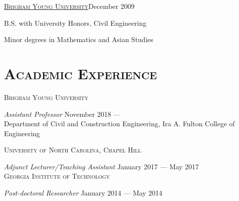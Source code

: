 \documentclass[margin,line]{res}
\newenvironment{list1}{
  \begin{list}{\ding{113}}{%
      \setlength{\itemsep}{0in}
      \setlength{\parsep}{0in} \setlength{\parskip}{0in}
      \setlength{\topsep}{0in} \setlength{\partopsep}{0in}
      \setlength{\leftmargin}{0.17in}}}{\end{list}}
\newenvironment{list2}{
  \begin{list}{$\bullet$}{%
      \setlength{\itemsep}{0in}
      \setlength{\parsep}{0in} \setlength{\parskip}{0in}
      \setlength{\topsep}{0in} \setlength{\partopsep}{0in}
      \setlength{\leftmargin}{0.2in}}}{\end{list}}
\newcommand{\secfont}{\scshape }
\newcommand{\acc}{\scshape }
\begin{document}
\begin{resume}
\href{http://www.byu.edu}{\acc Brigham Young University}\hfill{December 2009}
\\
\vspace*{-.1in}
\begin{list1}
  \item[] B.S. with University Honors, Civil Engineering
	\item[] Minor	degrees in Mathematics and Asian Studies
\end{list1}

\noindent\makebox[\linewidth]{\rule{\linewidth}{0.4pt}}
\section{\secfont Academic Experience}

{\acc Brigham Young University}

\vspace{-.4cm}
\textit{Assistant Professor} \hfill {November 2018 --- }\\
Department of Civil and Construction Engineering, Ira A. Fulton College of Engineering

{\acc University of North Carolina, Chapel Hill}

\vspace{-.4cm}
\textit{Adjunct Lecturer/Teaching Assistant} \hfill {January 2017 --- May 2017}\\

\vspace{-.4cm}
{\acc Georgia Institute of Technology}

\vspace{-.4cm}
\textit{Post-doctoral Researcher} \hfill {January 2014 --- May 2014}\\

\vspace{-.4cm}

\end{resume}
\end{document}
